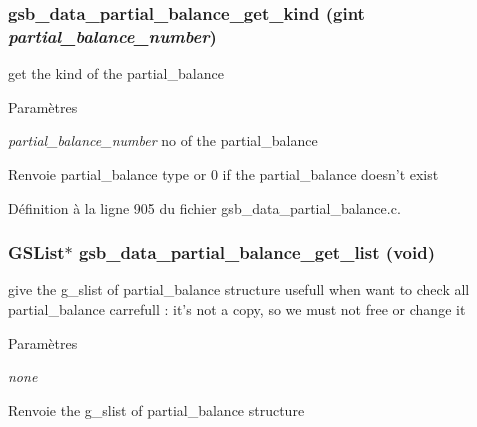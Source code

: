 \subsubsection[{gsb\_\-data\_\-partial\_\-balance\_\-get\_\-kind}]{ gsb\_\-data\_\-partial\_\-balance\_\-get\_\-kind (gint {\em partial\_\-balance\_\-number})}\label{gsb__data__partial__balance_8h_ae06d0d8f3876578c0c96fb902a2f1a64}
get the kind of the partial\_\-balance 
\begin{DoxyParams}{Paramètres}
\item[{\em partial\_\-balance\_\-number}]no of the partial\_\-balance\end{DoxyParams}
\begin{DoxyReturn}{Renvoie}
partial\_\-balance type or 0 if the partial\_\-balance doesn't exist 
\end{DoxyReturn}


Définition à la ligne 905 du fichier gsb\_\-data\_\-partial\_\-balance.c.

\subsubsection[{gsb\_\-data\_\-partial\_\-balance\_\-get\_\-list}]{\setlength{\rightskip}{0pt plus 5cm}GSList$\ast$ gsb\_\-data\_\-partial\_\-balance\_\-get\_\-list (void)}\label{gsb__data__partial__balance_8h_a09c15eba9140e6063aeaeb754481da19}
give the g\_\-slist of partial\_\-balance structure usefull when want to check all partial\_\-balance carrefull : it's not a copy, so we must not free or change it


\begin{DoxyParams}{Paramètres}
\item[{\em none}]\end{DoxyParams}
\begin{DoxyReturn}{Renvoie}
the g\_\-slist of partial\_\-balance structure 
\end{DoxyReturn}


